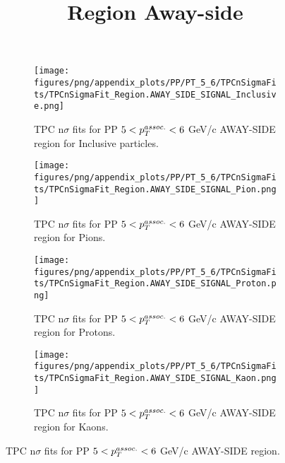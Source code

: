             \begin{figure}[H]
                \title{Region Away-side}
                \begin{subfigure}[b]{0.5\textwidth}
                    \centering
                    \texttt{[image: figures/png/appendix\_plots/PP/PT\_5\_6/TPCnSigmaFits/TPCnSigmaFit\_Region.AWAY\_SIDE\_SIGNAL\_Inclusive.png]}
                    \caption{TPC n$\sigma$ fits for PP $5 < \pTassoc < 6$ GeV/c AWAY-SIDE region for Inclusive particles.}
                    \label{fig:appendix_PP_$5 < \pTassoc < 6$ GeV/c_AWAY_SIDE_SIGNAL_Inclusive}
                \end{subfigure}
                \begin{subfigure}[b]{0.5\textwidth}
                    \centering
                    \texttt{[image: figures/png/appendix\_plots/PP/PT\_5\_6/TPCnSigmaFits/TPCnSigmaFit\_Region.AWAY\_SIDE\_SIGNAL\_Pion.png]}
                    \caption{TPC n$\sigma$ fits for PP $5 < \pTassoc < 6$ GeV/c AWAY-SIDE region for Pions.}
                    \label{fig:appendix_PP_$5 < \pTassoc < 6$ GeV/c_AWAY_SIDE_SIGNAL_Pion}
                \end{subfigure}
                \begin{subfigure}[b]{0.5\textwidth}
                    \centering
                    \texttt{[image: figures/png/appendix\_plots/PP/PT\_5\_6/TPCnSigmaFits/TPCnSigmaFit\_Region.AWAY\_SIDE\_SIGNAL\_Proton.png]}
                    \caption{TPC n$\sigma$ fits for PP $5 < \pTassoc < 6$ GeV/c AWAY-SIDE region for Protons.}
                    \label{fig:appendix_PP_$5 < \pTassoc < 6$ GeV/c_AWAY_SIDE_SIGNAL_Proton}
                \end{subfigure}
                \begin{subfigure}[b]{0.5\textwidth}
                    \centering
                    \texttt{[image: figures/png/appendix\_plots/PP/PT\_5\_6/TPCnSigmaFits/TPCnSigmaFit\_Region.AWAY\_SIDE\_SIGNAL\_Kaon.png]}
                    \caption{TPC n$\sigma$ fits for PP $5 < \pTassoc < 6$ GeV/c AWAY-SIDE region for Kaons.}
                    \label{fig:appendix_PP_$5 < \pTassoc < 6$ GeV/c_AWAY_SIDE_SIGNAL_Kaon}
                \end{subfigure}
                \caption{TPC n$\sigma$ fits for PP $5 < \pTassoc < 6$ GeV/c AWAY-SIDE region.}
                \label{fig:appendix_PP_$5 < \pTassoc < 6$ GeV/c_AWAY_SIDE_SIGNAL}
            \end{figure}
